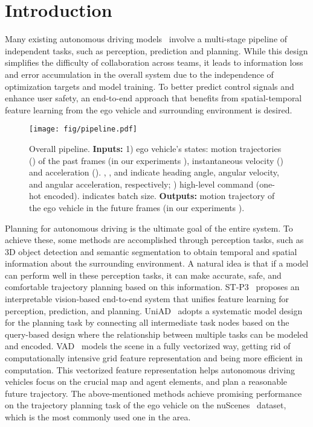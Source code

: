 \documentclass[10pt,twocolumn,letterpaper]{article}
\begin{document}
\section{Introduction}
\label{sec:intro}
Many existing autonomous driving models~\cite{liang2020pnpnet,luo2018fast,sadat2020perceive} involve a multi-stage pipeline of independent tasks, such as perception\cite{Xiong2023CAPE,li2022bevformer}, prediction\cite{fiery2021,densetnt} and planning\cite{Chitta2022PAMI,chen2021}. While this design simplifies the difficulty of collaboration across teams, it leads to information loss and error accumulation in the overall system due to the independence of optimization targets and model training. To better predict control signals and enhance user safety, an end-to-end approach that benefits from spatial-temporal feature learning from the ego vehicle and surrounding environment is desired.

\begin{figure*}[ht]
    \centering
    \small
    \texttt{[image: fig/pipeline.pdf]}
    \caption{
    Overall pipeline. 
    \textbf{Inputs:}
    1) ego vehicle's states: 
    motion trajectories () of the past  frames (in our experiments ), 
    instantaneous velocity ()
    and acceleration (). , , and  indicate heading angle, angular velocity, and angular acceleration, respectively;  
    ) high-level command (one-hot encoded).  indicates batch size.
    \textbf{Outputs:}
    motion trajectory of the ego vehicle in the 
    future  frames (in our experiments ).
    }
    \label{fig:Method}
\end{figure*}


Planning for autonomous driving is the ultimate goal of the entire system. To achieve these, some methods are accomplished through perception tasks, such as 3D object detection and semantic segmentation to obtain temporal and spatial information about the surrounding environment. 
A natural idea is that if a model can perform well in these perception tasks, it can make accurate, safe, and comfortable trajectory planning based on this information. ST-P3~\cite{hu2022st} proposes an interpretable vision-based end-to-end system that unifies feature learning for perception, prediction, and planning. 
UniAD~\cite{hu2022goal} adopts a systematic model design for the planning task by connecting all intermediate task nodes based on the query-based design where the relationship between multiple tasks can be modeled and encoded. VAD~\cite{jiang2023vad} models the scene in a fully vectorized way, getting rid of computationally intensive grid feature representation and being more efficient in computation. 
This vectorized feature representation helps autonomous driving vehicles focus on the crucial map and agent elements, and plan a reasonable future trajectory.
The above-mentioned methods 
achieve promising performance on the trajectory planning task of the ego vehicle on the nuScenes~\cite{caesar2020nuscenes} dataset, which is the most commonly used one
in the area.
\end{document}
